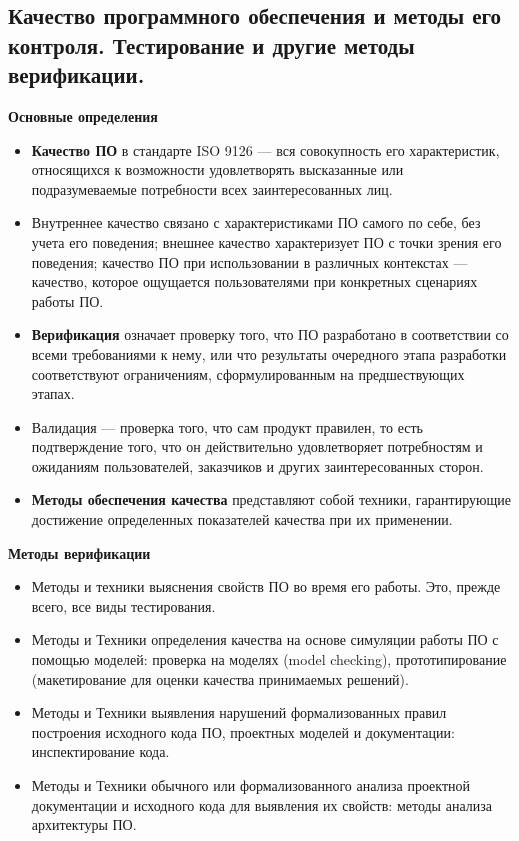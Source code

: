 \subsection{Качество программного обеспечения и методы его контроля. Тестирование и другие методы верификации.}

\textbf{Основные определения}
\begin{itemize}
    \item \textbf{Качество ПО} в стандарте ISO 9126 --- вся совокупность его характеристик, относящихся к возможности удовлетворять высказанные или подразумеваемые потребности всех заинтересованных лиц.
    \item Внутреннее качество связано с характеристиками ПО самого по себе, без учета его поведения; внешнее качество характеризует ПО с точки зрения его поведения; качество ПО при использовании в различных контекстах --- качество, которое ощущается пользователями при конкретных сценариях работы ПО.
    \item \textbf{Верификация} означает проверку того, что ПО разработано в соответствии со всеми требованиями к нему, или что результаты очередного этапа разработки соответствуют ограничениям, сформулированным на предшествующих этапах.
    \item Валидация --- проверка того, что сам продукт правилен, то есть подтверждение того, что он действительно удовлетворяет потребностям и ожиданиям пользователей, заказчиков и других заинтересованных сторон.
    \item \textbf{Методы обеспечения качества} представляют собой техники, гарантирующие достижение определенных показателей качества при их применении.
\end{itemize}

\textbf{Методы верификации}

\begin{itemize}
    \item Методы и техники выяснения свойств ПО во время его работы.
    Это, прежде всего, все виды тестирования.
    \item Методы и Техники определения качества на основе симуляции работы ПО с помощью моделей: проверка на моделях (model checking), прототипирование (макетирование для оценки качества принимаемых решений).
    \item Методы и Техники выявления нарушений формализованных правил построения исходного кода ПО, проектных моделей и документации: инспектирование кода.
    \item Методы и Техники обычного или формализованного анализа проектной документации и исходного кода для выявления их свойств: методы анализа архитектуры ПО.
\end{itemize}

